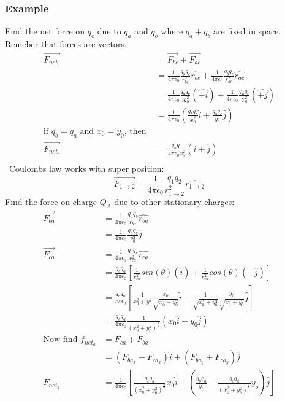   \subsubsection{Example}
  Find the net force on $q_c$ due to $q_a$ and $q_b$ where $q_a+q_b$ are fixed in space. Remeber that forces are vectors.
  \begin{align*}
    \vec{F_{net_c}}&=\vec{F_{bc}}+\vec{F_{ac}}\\
    &=\frac{1}{4\pi\epsilon_0}\frac{q_bq_c}{r_{bc}^2}\hat{r_{bc}}+\frac{1}{4\pi\epsilon_0}\frac{q_bq_c}{r_{ac}^2}\hat{r_{ac}}\\
    &=\frac{1}{4\pi\epsilon_0}\frac{q_bq_c}{X_0^2}(\hat{+i})+\frac{1}{4\pi\epsilon_0}\frac{q_aq_c}{Y_0^2}(\hat{+j})\\
    &=\frac{1}{4\pi\epsilon_0}\left(\frac{q_bq_c}{x_0^2}\hat{i}+\frac{q_bq_c}{y_0^2}\hat{j}\right)\\
    \text{if } q_b=q_a \text{ and } x_0=y_0 \text{, then }\\
    \vec{F_{net_c}}&=\frac{q_aq_c}{4\pi\epsilon_0x_0^2}(\hat{i}+\hat{j})\\
  \end{align*}\
  Coulombs law works with super position:
  \begin{equation*}
    \vec{F_{1\to2}}=\frac{1}{4\pi\epsilon_0}\frac{q_1q_2}{r_{1\to2}^2}\hat{r_{1\to2}}
  \end{equation*}
  Find the force on charge $Q_A$ due to other stationary charges:
  \begin{align*}
    \vec{F_{ba}}&=\frac{1}{4\pi\epsilon_0}\frac{q_aq_b}{r_{ba}}\hat{r_{ba}}\\
    &=\frac{1}{4\pi\epsilon_0}\frac{q_aq_b}{y_0^2}\hat{j}\\
    \vec{F_{ca}}&=\frac{1}{4\pi\epsilon_0}\frac{q_aq_c}{r_{ca}^2}\hat{r_{ca}}\\
    &=\frac{q_cq_a}{4\pi\epsilon_0}\left[\frac{1}{r_{ca}^2}sin(\theta)(\hat{i})+\frac{1}{r_{ca}^2}cos(\theta)(-\hat{j})\right]\\
    &=\frac{q_cq_a}{r\pi\epsilon_0}\left[\frac{1}{x_0^2+y_0^2}\frac{x_0}{\sqrt{x_0^2+y_0^2}}\hat{i}-\frac{1}{\sqrt{x_0^2+y_0^2}}\frac{y_0}{\sqrt{x_0^2+y_0^2}}\hat{j}\right]\\
    &=\frac{q_cq_a}{4\pi\epsilon_0}\frac{1}{(x_0^2+y_0^2)^{\frac{3}{2}}}(x_0\hat{i}-y_0\hat{j})\\
    \text{Now find }f_{net_a}&=F_{ca}+F_{ba}\\
    &=(F_{ba_x}+F_{ca_x})\hat{i}+(F_{ba_y}+F_{ca_y})\hat{j}\\
    F_{net_a}&=\frac{1}{4\pi\epsilon_0}\left[\frac{q_cq_a}{(x_0^2+y_0^2)^{\frac{3}{2}}}x_0\hat{i}+\left(\frac{q_bq_a}{y_0}-\frac{q_cq_a}{(x_0^2+y_0^2)^{\frac{3}{2}}}y_o\right)\hat{j}\right]\\
  \end{align*} 
